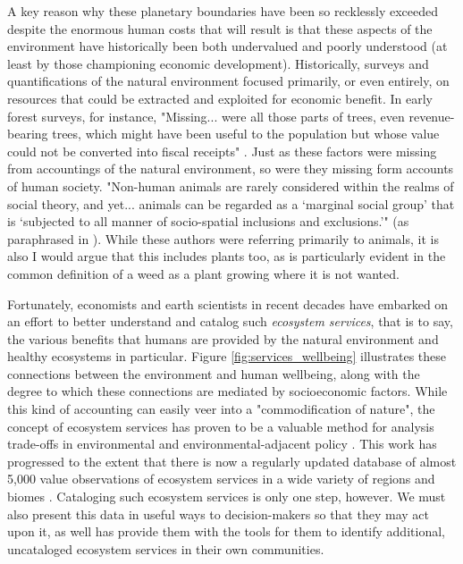 A key reason why these planetary boundaries have been so recklessly exceeded despite the enormous human costs that will result is that these aspects of the environment have historically been both undervalued and poorly understood (at least by those championing economic development). Historically, surveys and quantifications of the natural environment focused primarily, or even entirely, on resources that could be extracted and exploited for economic benefit. In early forest surveys, for instance, "Missing... were all those parts of trees, even revenue-bearing trees, which might have been useful to the population but whose value could not be converted into fiscal receipts" \cite{scottSeeingStateHow2020}. Just as these factors were missing from accountings of the natural environment, so were they missing form accounts of human society. "Non-human animals are rarely considered within the realms of social theory, and yet... animals can be regarded as a `marginal social group' that is `subjected to all manner of socio-spatial inclusions and exclusions.'" (\cite{philolAnimalsGeographyCity1995,westcoatBringingAnimalsBack1995,wolchAnimalGeographiesPlace1998}as paraphrased in \cite{harrisRethinkingMapsMorethanhuman2011}). While these authors were referring primarily to animals, it is also  I would argue that this includes plants too, as is particularly evident in the common definition of a weed as a plant growing where it is not wanted.

Fortunately, economists and earth scientists in recent decades have embarked on an effort to better understand and catalog such \textit{ecosystem services}, that is to say, the various benefits that humans are provided by the natural environment and healthy ecosystems in particular. Figure \ref{fig:services_wellbeing} illustrates these connections between the environment and human wellbeing, along with the degree to which these connections are mediated by socioeconomic factors. While this kind of accounting can easily veer into a "commodification of nature", the concept of ecosystem services has proven to be a valuable method for analysis trade-offs in environmental and environmental-adjacent policy \cite{mccauleySellingOutNature2006, guoEconomicsClimateChange2021}. This work has progressed to the extent that there is now a regularly updated database of almost 5,000 value observations of ecosystem services in a wide variety of regions and biomes \cite{grootEcosystemServicesValuation2020}. Cataloging such ecosystem services is only one step, however. We must also present this data in useful ways to decision-makers  so that they may act upon it, as well has provide them with the tools for them to identify additional, uncataloged ecosystem services in their own communities.


